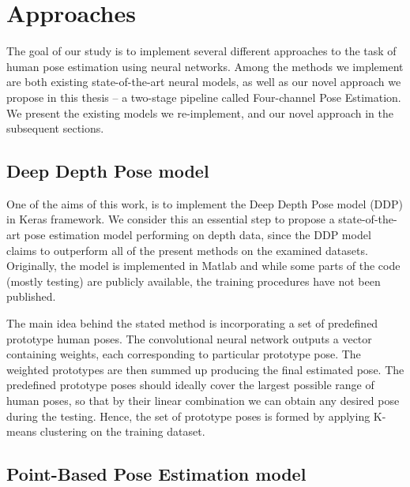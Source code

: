 \section{Approaches}
The goal of our study is to implement several different approaches to the task of human pose estimation using neural networks. Among the methods we implement are both existing state-of-the-art neural models, as well as our novel approach we propose in this thesis – a two-stage pipeline called Four-channel Pose Estimation. We present the existing models we re-implement, and our novel approach in the subsequent sections.

\subsection{Deep Depth Pose model}
One of the aims of this work, is to implement the Deep Depth Pose model (DDP) \cite{Marin18jvcir} in Keras framework. We consider this an essential step to propose a state-of-the-art pose estimation model performing on depth data, since the DDP model claims to outperform all of the present methods on the examined datasets. Originally, the model is implemented in Matlab and while some parts of the code (mostly testing) are publicly available, the training procedures have not been published.\par
\vspace{5mm}
\noindent
The main idea behind the stated method is incorporating a set of predefined prototype human poses. The convolutional neural network outputs a vector containing weights, each corresponding to particular prototype pose. The weighted prototypes are then summed up producing the final estimated pose. The predefined prototype poses should ideally cover the largest possible range of human poses, so that by their linear combination we can obtain any desired pose during the testing. Hence, the set of prototype poses is formed by applying K-means clustering on the training dataset.

\subsection{Point-Based Pose Estimation model}

